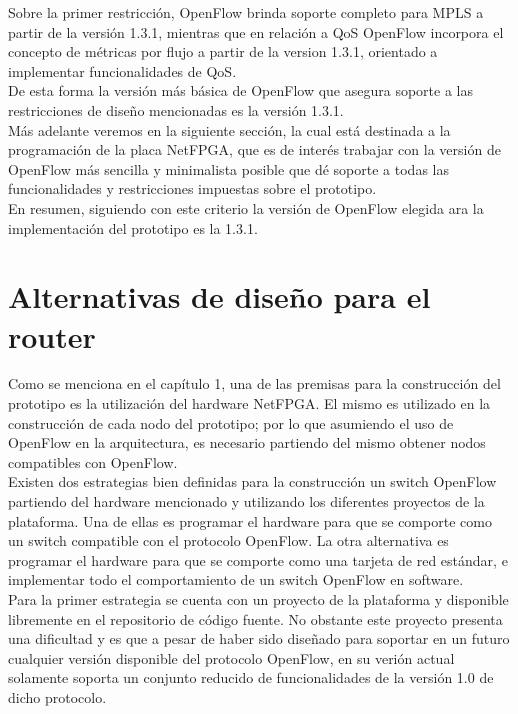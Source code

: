 Sobre la primer restricci\'on, OpenFlow brinda soporte completo para MPLS a partir de la versi\'on 1.3.1, mientras que en relaci\'on a QoS OpenFlow incorpora el concepto de métricas por flujo a partir de la version 1.3.1, orientado a implementar funcionalidades de QoS.\\

De esta forma la versi\'on m\'as b\'asica de OpenFlow que asegura soporte a las restricciones de dise\~no mencionadas es la versi\'on 1.3.1.\\

M\'as adelante veremos en la siguiente secci\'on, la cual  est\'a destinada a la programaci\'on de la placa NetFPGA, que es de inter\'es trabajar con la versi\'on de OpenFlow m\'as sencilla y minimalista posible que d\'e soporte a todas las funcionalidades y restricciones impuestas sobre el prototipo.\\ 

En resumen, siguiendo con este criterio la versi\'on de OpenFlow elegida ara la implementaci\'on del prototipo es la 1.3.1.

\section[Alternativas de dise\~no para el router]{Alternativas de dise\~no para el router}

Como se menciona en el cap\'itulo 1, una de las premisas para la construcción del prototipo es la utilizaci\'on del hardware NetFPGA. El mismo es utilizado en la construcción de cada nodo del prototipo; por lo que asumiendo el uso de OpenFlow en la arquitectura, es necesario partiendo del mismo obtener nodos compatibles con OpenFlow.\\ 

Existen dos estrategias bien definidas para la construcci\'on un switch OpenFlow partiendo del hardware mencionado y utilizando los diferentes proyectos de la plataforma. Una de ellas es programar el hardware para que se comporte como un switch compatible con el protocolo OpenFlow. La otra alternativa es programar el hardware para que se comporte como una tarjeta de red estándar, e implementar todo el comportamiento de un switch OpenFlow en software.\\

Para la primer estrategia se cuenta con un proyecto de la plataforma y disponible libremente en el repositorio de c\'odigo fuente. No obstante este proyecto presenta una dificultad y es que a pesar de haber sido dise\~nado para soportar en un futuro cualquier versi\'on disponible del protocolo OpenFlow, en su veri\'on actual solamente soporta un conjunto reducido de funcionalidades de la versi\'on 1.0 de dicho protocolo. 

